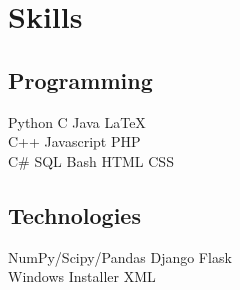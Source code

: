 \documentclass[letterpaper]{deedy-resume} %
\begin{document}
\begin{minipage}[t]{0.33\textwidth}
\sectionspace %


\section{Skills}

\subsection{Programming}

Python \textbullet{} C \textbullet{} Java  \textbullet{} \LaTeX\ \\
C++ \textbullet{} Javascript \textbullet{} PHP \\
C\# \textbullet{} SQL \textbullet{} Bash \textbullet{} HTML \textbullet{} CSS

\sectionspace %

\subsection{Technologies}

NumPy/Scipy/Pandas \textbullet{} Django \textbullet{} Flask \\
Windows Installer XML


\end{minipage} %
\hfill
%
%
\end{document}

